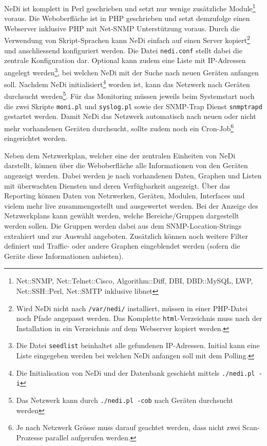  NeDi ist komplett in Perl geschrieben und setzt nur wenige zus\"atzliche Module\footnote{\label{foot:nedi-perl}Net::SNMP, Net::Telnet::Cisco, Algorithm::Diff, DBI, DBD::MySQL, LWP, Net::SSH::Perl, Net::SMTP inklusive libnet} voraus. Die Weboberfl\"ache ist in PHP geschrieben und setzt demzufolge einen Webserver inklusive PHP mit Net-SNMP Unterst\"utzung voraus. Durch die Verwendung von Skript-Sprachen kann NeDi einfach auf einen Server kopiert\footnote{\label{foot:nedi-install}Wird NeDi nicht nach \texttt{/var/nedi/} installiert, m\"ussen in einer PHP-Datei noch Pfade angepasst werden. Das Komplette \texttt{html}-Verzeichnis muss nach der Installation in ein Verzeichnis auf dem Webserver kopiert werden.} und anschliessend konfiguriert werden. Die Datei \texttt{nedi.conf} stellt dabei die zentrale Konfiguration dar. Optional kann zudem eine Liste mit IP-Adressen angelegt werden\footnote{\label{foot:nedi-seed}Die Datei \texttt{seedlist} beinhaltet alle gefundenen IP-Adressen. Initial kann eine Liste eingegeben werden bei welchen NeDi anfangen soll mit dem Polling.}, bei welchen NeDi mit der Suche nach neuen Ger\"aten anfangen soll. Nachdem NeDi initialisiert\footnote{\label{foot:nedi-init}Die Initialisation von NeDi und der Datenbank geschieht mittels \texttt{./nedi.pl -i}} worden ist, kann das Netzwerk nach Ger\"aten durchsucht werden\footnote{\label{foot:nedi-polling}Das Netzwerk kann durch \texttt{./nedi.pl -cob} nach Ger\"aten durchsucht werden}. F\"ur das Monitoring m\"ussen jeweils beim Systemstart noch die zwei Skripte \texttt{moni.pl} und \texttt{syslog.pl} sowie der SNMP-Trap Dienst \texttt{snmptrapd} gestartet werden. Damit NeDi das Netzwerk automatisch nach neuen oder nicht mehr vorhandenen Ger\"aten durchsucht, sollte zudem noch ein Cron-Job\footnote{\label{foot:nedi-cron}Je nach Netzwerk Gr\"osse muss darauf geachtet werden, dass nicht zwei Scan-Prozesse parallel aufgerufen werden.} eingerichtet werden.

  Neben dem Netzwerkplan, welcher eine der zentralen Einheiten von NeDi darstellt, k\"onnen \"uber die Weboberfl\"ache alle Informationen von den Ger\"aten angezeigt werden. Dabei werden je nach vorhandenen Daten, Graphen und Listen mit \"uberwachten Diensten und deren Verf\"ugbarkeit angezeigt. \"Uber das Reporting k\"onnen Daten von Netzwerken, Ger\"aten, Modulen, Interfaces und vielem mehr live zusammengestellt und ausgewertet werden. Bei der Anzeige des Netzwerkplans kann gew\"ahlt werden, welche Bereiche/Gruppen dargestellt werden sollen. Die Gruppen werden dabei aus dem SNMP-Location-Strings extrahiert und zur Auswahl angeboten. Zus\"atzlich k\"onnen noch weitere Filter definiert und Traffic- oder andere Graphen eingeblendet werden (sofern die Ger\"ate diese Informationen anbieten).

